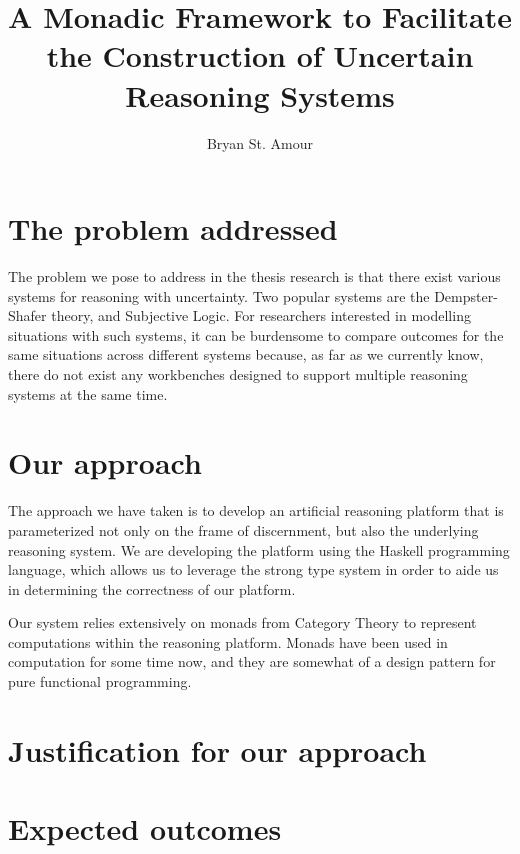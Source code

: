 \documentclass[a4paper]{article}
\title{A Monadic Framework to Facilitate the Construction of Uncertain Reasoning Systems}
\author{Bryan St. Amour}
\begin{document}
\maketitle

\section{The problem addressed}

\par
The problem we pose to address in the thesis research is that there exist various
systems for reasoning with uncertainty. Two popular systems are the
Dempster-Shafer theory, and Subjective Logic. For researchers interested in modelling
situations with such systems, it can be burdensome to compare outcomes for the same
situations across different systems because, as far as we currently know, there do
not exist any workbenches designed to support multiple reasoning systems at the same
time.

\section{Our approach}


\par
The approach we have taken is to develop an artificial reasoning platform that is
parameterized not only on the frame of discernment, but also the underlying
reasoning system. We are developing the platform using the Haskell programming
language, which allows us to leverage the strong type system in order to aide us
in determining the correctness of our platform.

\par
Our system relies extensively on monads from Category Theory to represent computations
within the reasoning platform. Monads have been used in computation for some time now,
and they are somewhat of a design pattern for pure functional programming.

\section{Justification for our approach}

\section{Expected outcomes}
\end{document}
